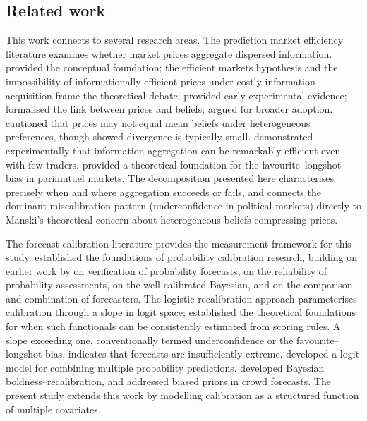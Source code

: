 \documentclass[numsec,webpdf,modern,medium]{oup-authoring-template}
\theoremstyle{thmstyleone}%
\theoremstyle{thmstyletwo}%
\theoremstyle{thmstylethree}%
\begin{document}
\subsection{Related work}\label{sec:related}

This work connects to several research areas. The prediction market efficiency literature examines whether market prices aggregate dispersed information. \citet{hayek1945use} provided the conceptual foundation; the efficient markets hypothesis \citep{fama1970efficient} and the impossibility of informationally efficient prices under costly information acquisition \citep{grossman1980impossibility} frame the theoretical debate; \citet{plott1988rational} provided early experimental evidence; \citet{wolfers2004prediction} formalised the link between prices and beliefs; \citet{arrow2008promise} argued for broader adoption. \citet{manski2006interpreting} cautioned that prices may not equal mean beliefs under heterogeneous preferences, though \citet{wolfers2006interpreting} showed divergence is typically small. \citet{chen2002information} demonstrated experimentally that information aggregation can be remarkably efficient even with few traders. \citet{ottaviani2008favorite} provided a theoretical foundation for the favourite--longshot bias in parimutuel markets. The decomposition presented here characterises precisely when and where aggregation succeeds or fails, and connects the dominant miscalibration pattern (underconfidence in political markets) directly to Manski's theoretical concern about heterogeneous beliefs compressing prices.

The forecast calibration literature provides the measurement framework for this study. \citet{lichtenstein1982calibration} established the foundations of probability calibration research, building on earlier work by \citet{brier1950verification} on verification of probability forecasts, \citet{murphy1977reliability} on the reliability of probability assessments, \citet{dawid1982well} on the well-calibrated Bayesian, and \citet{degroot1983comparison} on the comparison and combination of forecasters. The logistic recalibration approach \citep{platt1999probabilistic,gneiting2007strictly,winkler1996scoring,bickel2007comparisons} parameterises calibration through a slope in logit space; \citet{ziegel2016coherence} established the theoretical foundations for when such functionals can be consistently estimated from scoring rules. A slope exceeding one, conventionally termed underconfidence or the favourite--longshot bias, indicates that forecasts are insufficiently extreme. \citet{satopaa2014combining} developed a logit model for combining multiple probability predictions. \citet{liu2024boldness} developed Bayesian boldness--recalibration, and \citet{palley2024robust} addressed biased priors in crowd forecasts. The present study extends this work by modelling calibration as a structured function of multiple covariates.
\end{document}
